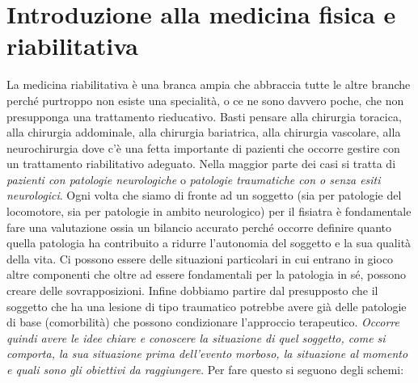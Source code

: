 \section{Introduzione alla medicina fisica e riabilitativa}

La medicina riabilitativa è una branca ampia che abbraccia tutte le altre branche perché purtroppo non esiste una specialità, o ce ne sono davvero poche, che non presupponga una trattamento rieducativo. Basti pensare alla chirurgia toracica, alla chirurgia addominale, alla
chirurgia bariatrica, alla chirurgia vascolare, alla neurochirurgia dove c'è una fetta importante di pazienti che occorre gestire con un trattamento riabilitativo adeguato. Nella maggior parte dei casi si tratta di \emph{pazienti con patologie neurologiche} o \emph{patologie traumatiche con o senza esiti neurologici}. Ogni volta che siamo di fronte ad un soggetto (sia per patologie del locomotore, sia per
patologie in ambito neurologico) per il fisiatra è fondamentale fare una valutazione ossia un bilancio accurato perché occorre definire quanto quella patologia ha contribuito a ridurre l'autonomia del soggetto e la
sua qualità della vita. Ci possono essere delle situazioni particolari in cui entrano in gioco altre componenti che oltre ad essere fondamentali per la patologia in sé, possono creare delle sovrapposizioni. Infine dobbiamo partire dal presupposto che il soggetto che ha una lesione di tipo traumatico potrebbe avere già delle patologie
di base (comorbilità) che possono condizionare l'approccio terapeutico.
\emph{Occorre quindi avere le idee chiare e conoscere la situazione di quel soggetto, come si comporta, la sua situazione prima dell'evento morboso, la situazione al momento e quali sono gli obiettivi da raggiungere}. Per fare questo si seguono degli schemi:

